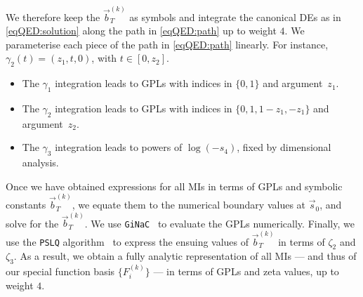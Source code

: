\documentclass[main.tex]{subfiles}
\begin{document}
We therefore keep the $\vec{b}^{(k)}_{T}$ as symbols and integrate the canonical DEs as in \cref{eqQED:solution} along the path in \cref{eqQED:path} up to weight $4$. 
We parameterise each piece of the path in \cref{eqQED:path} linearly. For instance, 
$\gamma_2(t) = ( z_1,  t  , 0 )$,
with $t \in [0,z_2]$.
\begin{itemize}
\item The $\gamma_1$ integration leads to GPLs with indices in $\{0,1\}$ and argument~$z_1$.
\item The $\gamma_2$ integration leads to GPLs with indices in $\{0,1, 1-z_1, -z_1\}$ and argument~$z_2$.
\item The $\gamma_3$ integration leads to powers of $\log(-s_4)$, fixed by dimensional analysis.
\end{itemize}
Once we have obtained expressions for all MIs in terms of GPLs and symbolic constants $\vec{b}^{(k)}_T$, we equate them to the numerical boundary values at $\vec{s}_0$, and solve for the $\vec{b}^{(k)}_{T}$. We use \texttt{GiNaC}~\cite{Bauer:2000cp,Vollinga:2004sn} to evaluate the GPLs numerically.
Finally, we use the \texttt{PSLQ} algorithm~\cite{PSLQ} to express the ensuing values of $\vec{b}^{(k)}_{T}$ in terms of $\zeta_2$ and $\zeta_3$. As a result, we obtain a fully analytic representation of all MIs --- and thus of our special function basis $\{F^{(k)}_i\}$ --- in terms of GPLs and zeta values, up to weight $4$.
\end{document}
